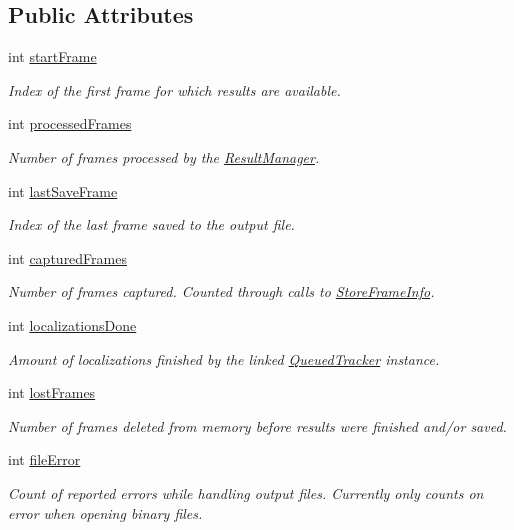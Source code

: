 \subsection*{Public Attributes}
\begin{DoxyCompactItemize}
\item 
int \hyperlink{struct_result_manager_1_1_frame_counters_a91cdacd9e2418fc49cdebabc171a1aa6}{start\+Frame}
\begin{DoxyCompactList}\small\item\em Index of the first frame for which results are available. \end{DoxyCompactList}\item 
int \hyperlink{struct_result_manager_1_1_frame_counters_a9170beb3735c4d08f00050377eeebef5}{processed\+Frames}
\begin{DoxyCompactList}\small\item\em Number of frames processed by the \hyperlink{class_result_manager}{Result\+Manager}. \end{DoxyCompactList}\item 
int \hyperlink{struct_result_manager_1_1_frame_counters_a529d0916bd3925ce9b60de516875ae2e}{last\+Save\+Frame}
\begin{DoxyCompactList}\small\item\em Index of the last frame saved to the output file. \end{DoxyCompactList}\item 
int \hyperlink{struct_result_manager_1_1_frame_counters_ae9b12ed92f9c0a9e72a51beaf9cca61f}{captured\+Frames}
\begin{DoxyCompactList}\small\item\em Number of frames captured. Counted through calls to \hyperlink{class_result_manager_a0bbedc935395c1af29f175f81ab063c9}{Store\+Frame\+Info}. \end{DoxyCompactList}\item 
int \hyperlink{struct_result_manager_1_1_frame_counters_a9ab895a45863f01089a4fa47629e3998}{localizations\+Done}
\begin{DoxyCompactList}\small\item\em Amount of localizations finished by the linked \hyperlink{class_queued_tracker}{Queued\+Tracker} instance. \end{DoxyCompactList}\item 
int \hyperlink{struct_result_manager_1_1_frame_counters_a843774dd839c1edc8c0245b830b9f469}{lost\+Frames}
\begin{DoxyCompactList}\small\item\em Number of frames deleted from memory before results were finished and/or saved. \end{DoxyCompactList}\item 
int \hyperlink{struct_result_manager_1_1_frame_counters_a524c00c33ddf14ff4f3e467f4daaf7f8}{file\+Error}
\begin{DoxyCompactList}\small\item\em Count of reported errors while handling output files. Currently only counts on error when opening binary files. \end{DoxyCompactList}\end{DoxyCompactItemize}


